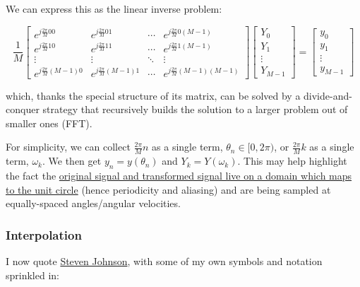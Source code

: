 \documentclass[10pt]{article}
\begin{document}
We can express this as the linear inverse problem:

$$\frac{1}{M}\begin{bmatrix}
  e^{j \frac{2\pi}{M} 0 0} & e^{j \frac{2\pi}{M} 0 1} & \cdots & e^{j \frac{2\pi}{M} 0 (M-1)}\\
  e^{j \frac{2\pi}{M} 1 0} & e^{j \frac{2\pi}{M} 1 1} & \cdots & e^{j \frac{2\pi}{M} 1 (M-1)} \\
  \vdots & \vdots & \ddots & \vdots\\
  e^{j \frac{2\pi}{M} (M-1) 0} & e^{j \frac{2\pi}{M} (M-1) 1} & \cdots & e^{j \frac{2\pi}{M} (M-1) (M-1)}
\end{bmatrix}
\begin{bmatrix} Y_0 \\ Y_1 \\ \vdots \\ Y_{M-1} \end{bmatrix}
= \begin{bmatrix} y_0 \\ y_1 \\ \vdots \\ y_{M-1} \end{bmatrix}$$

\noindent which, thanks the special structure of its matrix, can be solved by a divide-and-conquer strategy that recursively builds the solution to a larger problem out of smaller ones (FFT)\cite{kutz}.

For simplicity, we can collect $\frac{2\pi}{M}n$ as a single term, $\theta_n \in [0, 2\pi)$, or $\frac{2\pi}{M}k$ as a single term, $\omega_k$. We then get $y_n = y(\theta_n)$ and $Y_k = Y(\omega_k)$. This may help highlight the fact the \href{https://dsp.stackexchange.com/a/18931/40873}{original signal and transformed signal live on a domain which maps to the unit circle}\cite{bristow} (hence periodicity and aliasing) and are being sampled at equally-spaced angles/angular velocities.

\subsubsection{Interpolation}

I now quote \href{https://math.mit.edu/~stevenj/fft-deriv.pdf}{Steven Johnson}\cite{johnson}, with some of my own symbols and notation sprinkled in:
\end{document}
